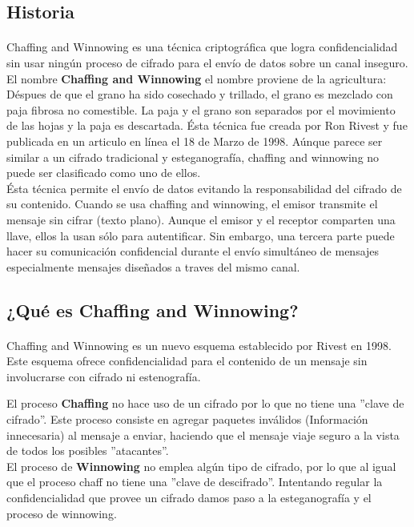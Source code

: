 \documentclass[12pt, a4paper, titlepage]{report}
\begin{document}
	    \subsection{Historia}
	    
	    \paragraph{}
	    Chaffing and Winnowing es una t\'ecnica criptogr\'afica que logra confidencialidad sin usar ning\'un proceso de cifrado para el env\'io de datos sobre un canal inseguro. El nombre \textbf{Chaffing and Winnowing} el nombre proviene de la agricultura: D\'espues de que el grano ha sido cosechado y trillado, el grano es mezclado con paja fibrosa no comestible. La paja y el grano son separados por el movimiento de las hojas y la paja es descartada.
	    \'Esta t\'ecnica fue creada por Ron Rivest y fue publicada en un articulo en l\'inea el 18 de Marzo de 1998. \cite{refRivestMIT}
	    A\'unque parece ser similar a un cifrado tradicional y esteganograf\'ia, chaffing and winnowing no puede ser clasificado como uno de ellos.\\
	    \'Esta t\'ecnica permite el env\'io de datos evitando la responsabilidad del cifrado de su contenido. Cuando se usa chaffing and winnowing, el emisor transmite el mensaje sin cifrar (texto plano). Aunque el emisor y el receptor comparten una llave, ellos la usan s\'olo para autentificar. Sin embargo, una tercera parte puede hacer su comunicaci\'on confidencial durante el env\'io simult\'aneo de mensajes especialmente mensajes diseñados a traves del mismo canal.
	    
	    \subsection{¿Qu\'e es Chaffing and Winnowing?}
	    
	    \paragraph{}
	        Chaffing and Winnowing es un nuevo esquema establecido por Rivest en 1998. Este esquema ofrece confidencialidad para el contenido de un mensaje sin involucrarse con cifrado ni estenografía. \cite{refChaffing}
	    
        El proceso \textbf{Chaffing} no hace uso de un cifrado por lo que no tiene una ''clave de cifrado''. Este proceso consiste en agregar paquetes inv\'alidos (Informaci\'on innecesaria) al mensaje a enviar, haciendo que el mensaje viaje seguro a la vista de todos los posibles ''atacantes''.\\
        El proceso de \textbf{Winnowing} no emplea alg\'un tipo de cifrado, por lo que al igual que el proceso chaff no tiene una ''clave de descifrado''. Intentando regular la confidencialidad que provee un cifrado damos paso a la esteganograf\'ia y el proceso de winnowing.\cite{refRivestMIT}
        
\end{document}

